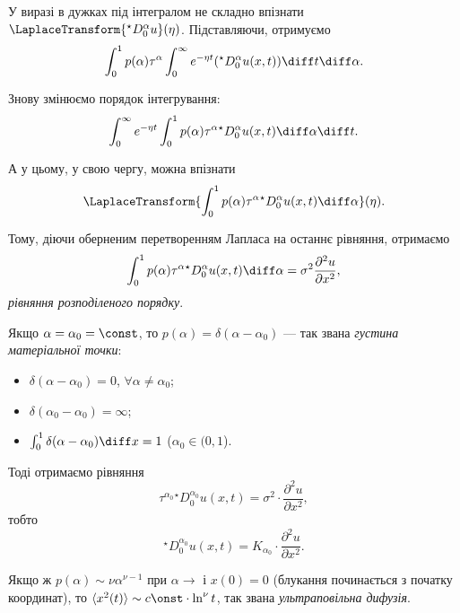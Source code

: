 У виразі в дужках під інтегралом не складно впізнати $\LaplaceTransform{{}^\star D_0^\alpha u}(\eta)$. Підставляючи, отримуємо
\begin{equation}
    \int_0^1 p(\alpha) \tau^\alpha \int_0^\infty e^{-\eta t} ({}^\star D_0^\alpha u(x, t)) \diff t \diff \alpha.
\end{equation}

Знову змінюємо порядок інтегрування:
\begin{equation}
    \int_0^\infty e^{-\eta t} \int_0^1 p(\alpha) \tau^\alpha {}^\star D_0^\alpha u(x, t) \diff \alpha \diff t.
\end{equation}

А у цьому, у свою чергу, можна впізнати
\begin{equation}
    \LaplaceTransform{\int_0^1 p(\alpha) \tau^\alpha {}^\star D_0^\alpha u(x, t) \diff \alpha }(\eta).
\end{equation}

Тому, діючи оберненим перетворенням Лапласа на останнє рівняння, отримаємо
\begin{equation}
    \int_0^1 p(\alpha) \tau^\alpha {}^\star D_0^\alpha u(x, t) \diff \alpha = \sigma^2 \frac{\partial^2 u}{\partial x^2},
\end{equation}
\textit{рівняння розподіленого порядку}.

\begin{example}
    Якщо $\alpha = \alpha_0 = \const$, то $p(\alpha) = \delta(\alpha - \alpha_0)$ --- так звана \textit{густина матеріальної точки}:
    \begin{itemize}
        \item $\delta (\alpha - \alpha_0) = 0$, $\forall \alpha \ne \alpha_0$;
        \item $\delta (\alpha_0 - \alpha_0) = \infty$;
        \item $\int_0^1 \delta(\alpha - \alpha_0) \diff x = 1$ ($\alpha_0 \in (0, 1$).
    \end{itemize}    
    
    Тоді отримаємо рівняння
    \begin{equation}
        \tau^{\alpha_0} {}^\star D_0^{\alpha_0} u(x, t) = \sigma^2 \cdot \frac{\partial^2 u}{\partial x^2},
    \end{equation}
    тобто
    \begin{equation}
        {}^\star D_0^{\alpha_0} u(x, t) = K_{\alpha_0} \cdot \frac{\partial^2 u}{\partial x^2}.
    \end{equation}
\end{example}

\begin{example}
    Якщо ж $p(\alpha) \sim \nu \alpha^{\nu - 1}$ при $\alpha \to $ і $x(0) = 0$ (блукання починається з початку координат), то $\langle x^2(t) \rangle \sim c\onst \cdot \ln^\nu t$, так звана \textit{ультраповільна дифузія}.
\end{example}
